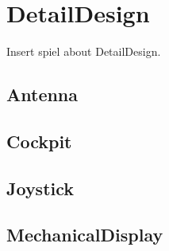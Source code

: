 

\chapter{DetailDesign}

Insert spiel about DetailDesign.

\section{Antenna}


\section{Cockpit}


\section{Joystick}


\section{MechanicalDisplay}

